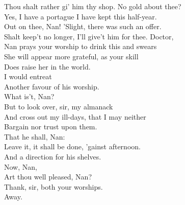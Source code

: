 \documentclass[a4paper,oneside,12pt]{memoir}
\begin{document}
\begin{drama*}
Thou shalt rather gi' him thy shop. No gold about thee?\\
\druggerspeaks Yes, I have a portague I have kept this half-year.\\
\facespeaks Out on thee, Nan! 'Slight, there was such an offer.\\
Shalt keep't no longer, I'll give't him for thee. Doctor,\\
Nan prays your worship to drink this and swears\\
She will appear more grateful, as your skill\\
Does raise her in the world.\\
\druggerspeaks {} I would entreat\\
Another favour of his worship.\\
\facespeaks What is't, Nan?\\
\druggerspeaks {} But to look over, sir, my almanack\\
And cross out my ill-days, that I may neither\\
Bargain nor trust upon them.\\
\facespeaks {} That he shall, Nan:\\
Leave it, it shall be done, 'gainst afternoon.\\
\subtlespeaks And a direction for his shelves.\\
\facespeaks {} Now, Nan,\\
Art thou well pleased, Nan?\\
\druggerspeaks {} Thank, sir, both your worships.\\
\facespeaks {} Away.\\

\scene


\end{drama*}
\end{document}
